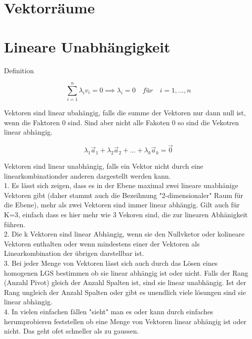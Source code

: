 \documentclass[9pt,a4paper]{article}
\begin{document}
    \tableofcontents
    \section{Vektorräume}
    
    \section{Lineare Unabhängigkeit}
    
    Definition
    
    $$\sum_{i=1}^n\lambda_i v_i = 0 \implies \lambda_i = 0 \quad für \quad i=1,...,n$$
    
    Vektoren sind linear ubahängig, falls die summe der Vektoren nur dann null ist, wenn die Faktoren 0 sind. Sind aber nicht alle Fakoten 0 so sind die Vekotren linear abhängig.
    
    $$\lambda_1 \vec{a}_1 + \lambda_2 \vec{a}_2 + ... + \lambda_k \vec{a}_k = \vec{0}$$
    
    Vektoren sind linear unabhängig, falls ein Vektor nicht durch eine linearkombinationder anderen dargestellt werden kann. \\
    
    1. Es lässt sich zeigen, dass es in der Ebene maximal zwei lineare unabhänige Vektoren gibt (daher stammt auch die Bezeihnung "2-dimensionaler" Raum für die Ebene), mehr als zwei Vektoren sind immer linear abhängig. Gilt auch für K=3, einfach dass es hier mehr wie 3 Vekoren sind, die zur linearen Abhänigkeit führen. \\
    
    2. Die k Vektoren sind linear Abhängig, wenn sie den Nullvketor oder kolineare Vektoren enthalten oder wenn mindestens einer der Vektoren als Linearkombination der übrigen darstellbar ist. \\
    
    3. Bei jeder Menge von Vektoren lässt sich auch durch das Lösen eines homogenen LGS bestimmen ob sie linear abhängig ist oder nicht. Falls der Rang (Anzahl Pivot) gleich der Anzahl Spalten ist, sind sie linear unabhängig. Ist der Rang ungleich der Anzahl Spalten oder gibt es unendlich viele lösungen sind sie linear abhängig. \\
    
    4. In vielen einfachen fällen "sieht" man es oder kann durch einfaches herumprobieren feststellen ob eine Menge von Vektoren linear abhängig ist oder nicht. Das geht ofet schneller als zu gaussen.
    
\end{document}
